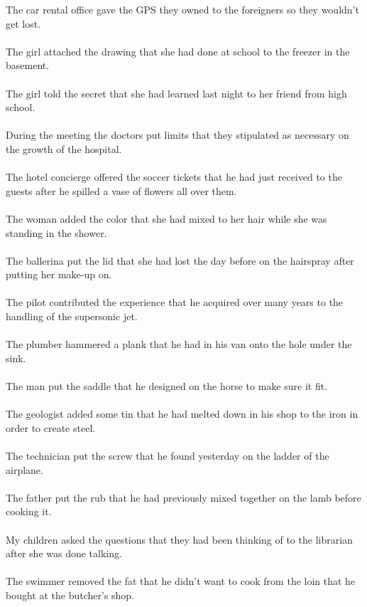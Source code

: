 The car rental office gave the GPS they owned to the foreigners so they wouldn't get lost.	\\	\\
The girl attached the drawing that she had done at school to the freezer in the basement.	\\	\\
The girl told the secret that she had learned last night to her friend from high school.	\\	\\
During the meeting the doctors put limits that they stipulated as necessary on the growth of the hospital.	\\	\\
The hotel concierge offered the soccer tickets that he had just received to the guests after he spilled a vase of flowers all over them.	\\	\\
The woman added the color that she had mixed to her hair while she was standing in the shower.	\\	\\
The ballerina put the lid that she had lost the day before on the hairspray after putting her make-up on.	\\	\\
The pilot contributed the experience that he acquired over many years to the handling of the supersonic jet.	\\	\\
The plumber hammered a plank that he had in his van onto the hole under the sink.	\\	\\
The man put the saddle that he designed on the horse to make sure it fit.	\\	\\
The geologist added some tin that he had melted down in his shop to the iron in order to create steel.	\\	\\
The technician put the screw that he found yesterday on the ladder of the airplane.	\\	\\
The father put the rub that he had previously mixed together on the lamb before cooking it.	\\	\\
My children asked the questions that they had been thinking of to the librarian after she was done talking.	\\	\\
The swimmer removed the fat that he didn't want to cook from the loin that he bought at the butcher's shop.	\\	\\
